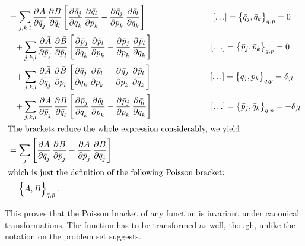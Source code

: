 \documentclass[11pt, ngerman, fleqn, DIV=15, headinclude, BCOR=1cm]{scrartcl}
\begin{document}
\begin{align*}
{    }
    &=
    \sum_{j, k, l}\dpd{\bar A}{\bar q_j} \dpd{\bar B}{\bar q_l} \sbr{
        \dpd{\bar q_j}{q_k}
        \dpd{\bar q_l}{p_k}
        - \dpd{\bar q_j}{p_k}
        \dpd{\bar q_l}{q_k}
    } \hspace{8em} [\ldots] = \cbr{\bar q_j, \bar q_k}_{q,p} = 0 \\
    &\phantom=+ \sum_{j, k, l}\dpd{\bar A}{\bar p_j} \dpd{\bar B}{\bar p_l} \sbr{
        \dpd{\bar p_j}{q_k}
        \dpd{\bar p_l}{p_k}
        - \dpd{\bar p_j}{p_k}
        \dpd{\bar p_l}{q_k}
    } \hspace{7em} [\ldots] = \cbr{\bar p_j, \bar p_k}_{q,p} = 0 \\
    &\phantom=+ \sum_{j, k, l}\dpd{\bar A}{\bar q_j} \dpd{\bar B}{\bar p_l} \sbr{
        \dpd{\bar q_j}{q_k}
        \dpd{\bar p_l}{p_k}
        - \dpd{\bar q_j}{p_k}
        \dpd{\bar p_l}{q_k}
    } \hspace{7em} [\ldots] = \cbr{\bar q_j, \bar p_k}_{q,p} = \delta_{jl} \\
    &\phantom=+ \sum_{j, k, l}\dpd{\bar A}{\bar p_j} \dpd{\bar B}{\bar q_l} \sbr{
        \dpd{\bar p_j}{q_k}
        \dpd{\bar q_l}{p_k}
        - \dpd{\bar p_j}{p_k}
        \dpd{\bar q_l}{q_k}
    } \hspace{7em} [\ldots] = \cbr{\bar p_j, \bar q_k}_{q,p} = -\delta_{jl} \\
    \intertext{%
        The brackets reduce the whole expression considerably, we yield
    }
    &= \sum_j \sbr{ \dpd{\bar A}{\bar q_j} \dpd{\bar B}{\bar p_j} - \dpd{\bar
    A}{\bar p_j} \dpd{\bar B}{\bar q_j}} \\
    \intertext{%
        which is just the definition of the following Poisson bracket:
    }
    &= \cbr{\bar A, \bar B}_{\bar q, \bar p}.
\end{align*}

This proves that the Poisson bracket of any function is invariant under
canonical transformations. The function has to be transformed as well, though,
unlike the notation on the problem set suggests.
\end{document}
